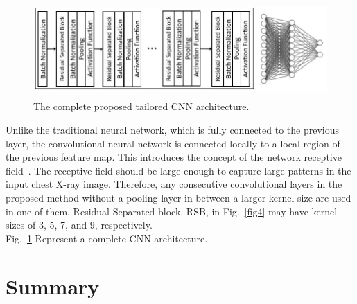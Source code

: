 \begin{figure}
    \begin{center}
    \includegraphics[height=37mm,width=14.0cm]{Figures/fig5.jpg}
    \caption{The complete proposed tailored CNN architecture.}
    \label{fig5}
    \end{center}
    \end{figure}
    
Unlike the traditional neural network, which is fully connected to the previous layer, the convolutional neural network is connected locally to a local region of the previous feature map. This introduces the concept of the network receptive field~\cite{luo2016understanding}. The receptive field should be large enough to capture large patterns in the input chest X-ray image. Therefore, any consecutive convolutional layers in the proposed method without a pooling layer in between a larger kernel size are used in one of them. Residual Separated block, RSB, in Fig.~\ref{fig4} may have kernel sizes of 3, 5, 7, and 9, respectively.\\
Fig.~\ref{fig5} Represent a complete CNN architecture.

\section{Summary}



